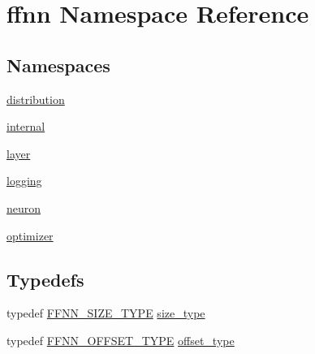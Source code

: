 \hypertarget{namespaceffnn}{\section{ffnn Namespace Reference}
\label{namespaceffnn}
}
\subsection*{Namespaces}
\begin{DoxyCompactItemize}
\item 
\hyperlink{namespaceffnn_1_1distribution}{distribution}
\item 
\hyperlink{namespaceffnn_1_1internal}{internal}
\item 
\hyperlink{namespaceffnn_1_1layer}{layer}
\item 
\hyperlink{namespaceffnn_1_1logging}{logging}
\item 
\hyperlink{namespaceffnn_1_1neuron}{neuron}
\item 
\hyperlink{namespaceffnn_1_1optimizer}{optimizer}
\end{DoxyCompactItemize}
\subsection*{Typedefs}
\begin{DoxyCompactItemize}
\item 
typedef \hyperlink{global_8h_aab5a5a098c5bf31f4176f4a141d2ef65}{F\-F\-N\-N\-\_\-\-S\-I\-Z\-E\-\_\-\-T\-Y\-P\-E} \hyperlink{namespaceffnn_a63b90a2fd70eb76684eac482a51633e5}{size\-\_\-type}
\item 
typedef \hyperlink{global_8h_af04b6e835b960cffc7ed05dfd1685ba0}{F\-F\-N\-N\-\_\-\-O\-F\-F\-S\-E\-T\-\_\-\-T\-Y\-P\-E} \hyperlink{namespaceffnn_add5752d74b38c6e9b200f3d696fc3ec8}{offset\-\_\-type}
\end{DoxyCompactItemize}
